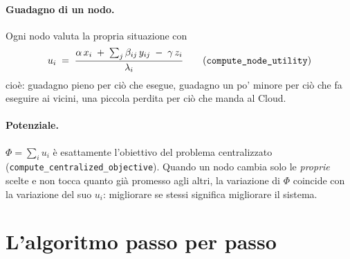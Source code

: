 \documentclass[11pt,a4paper]{article}
\newcommand{\Phiv}{\Phi}
\newcommand{\code}[1]{\texttt{#1}}
\begin{document}
\paragraph{Guadagno di un nodo.} Ogni nodo valuta la propria situazione con
\[
  u_i \;=\; \frac{\alpha\,x_i \;+\; \sum_j \beta_{ij}\,y_{ij} \;-\; \gamma\,z_i}{\lambda_i}
  \qquad(\text{\code{compute\_node\_utility}})
\]
cio\`e: guadagno pieno per ci\`o che esegue, guadagno un po' minore per ci\`o
che fa eseguire ai vicini, una piccola perdita per ci\`o che manda al Cloud.

\paragraph{Potenziale.} $\Phiv = \sum_i u_i$ \`e esattamente l'obiettivo del
problema centralizzato
(\code{compute\_centralized\_objective}). Quando un nodo
cambia solo le \emph{proprie} scelte e non tocca quanto gi\`a promesso agli
altri, la variazione di $\Phiv$ coincide con la variazione del suo $u_i$:
migliorare se stessi significa migliorare il sistema.

\section{L'algoritmo passo per passo}
\end{document}
